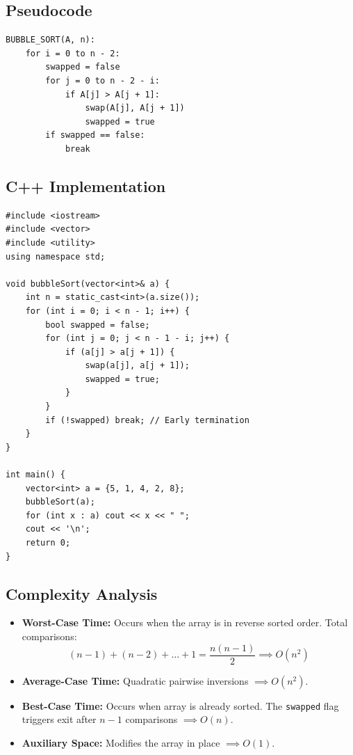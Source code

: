 \subsection{Pseudocode}

\begin{lstlisting}[style=pseudocode, caption={Optimized Bubble Sort Pseudocode.}]
BUBBLE_SORT(A, n):
    for i = 0 to n - 2:
        swapped = false
        for j = 0 to n - 2 - i:
            if A[j] > A[j + 1]:
                swap(A[j], A[j + 1])
                swapped = true
        if swapped == false:
            break
\end{lstlisting}

\subsection{C++ Implementation}

\begin{lstlisting}[style=cppstyle, caption={C++ Optimized Bubble Sort Implementation.}]
#include <iostream>
#include <vector>
#include <utility>
using namespace std;

void bubbleSort(vector<int>& a) {
    int n = static_cast<int>(a.size());
    for (int i = 0; i < n - 1; i++) {
        bool swapped = false;
        for (int j = 0; j < n - 1 - i; j++) {
            if (a[j] > a[j + 1]) {
                swap(a[j], a[j + 1]);
                swapped = true;
            }
        }
        if (!swapped) break; // Early termination
    }
}

int main() {
    vector<int> a = {5, 1, 4, 2, 8};
    bubbleSort(a);
    for (int x : a) cout << x << " ";
    cout << '\n';
    return 0;
}
\end{lstlisting}

\subsection{Complexity Analysis}
\begin{itemize}
    \item \textbf{Worst-Case Time:} Occurs when the array is in reverse sorted order. Total comparisons:
    \[
    (n-1) + (n-2) + \dots + 1 = \frac{n(n-1)}{2} \implies \boxed{O(n^2)}
    \]
    \item \textbf{Average-Case Time:} Quadratic pairwise inversions $\implies \boxed{O(n^2)}$.
    \item \textbf{Best-Case Time:} Occurs when array is already sorted. The \texttt{swapped} flag triggers exit after $n-1$ comparisons $\implies \boxed{O(n)}$.
    \item \textbf{Auxiliary Space:} Modifies the array in place $\implies \boxed{O(1)}$.
\end{itemize}

